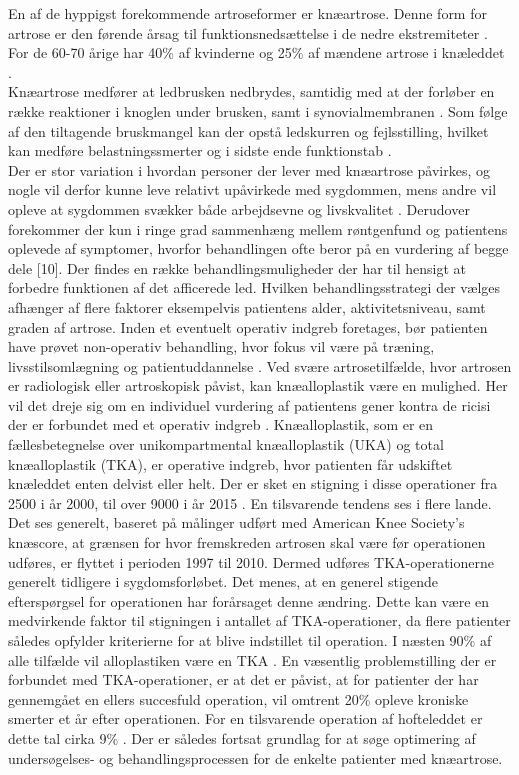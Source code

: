 En af de hyppigst forekommende artroseformer er knæartrose. Denne form for artrose er den førende årsag til funktionsnedsættelse i de nedre ekstremiteter \cite{bezwick2012}. For de 60-70 årige har 40\% af kvinderne og 25\% af mændene artrose i knæleddet \citep{schroder}.\\
Knæartrose medfører at ledbrusken nedbrydes, samtidig med at der forløber en række reaktioner i knoglen under brusken, samt i synovialmembranen \citep{brostrom2012}. Som følge af den tiltagende bruskmangel kan der opstå ledskurren og fejlsstilling, hvilket kan medføre belastningssmerter og i sidste ende funktionstab \citep{ugeskrift2011}. \\
Der er stor variation i hvordan personer der lever med knæartrose påvirkes, og nogle vil derfor kunne leve relativt upåvirkede med sygdommen, mens andre vil opleve at sygdommen svækker både arbejdsevne og livskvalitet \citep{sygdom}. Derudover forekommer der kun i ringe grad sammenhæng mellem røntgenfund og patientens oplevede af symptomer, hvorfor behandlingen ofte beror på en vurdering af begge dele [10]. Der findes en række behandlingsmuligheder der har til hensigt at forbedre funktionen af det afficerede led. Hvilken behandlingsstrategi der vælges afhænger af flere faktorer eksempelvis patientens alder, aktivitetsniveau, samt graden af artrose. Inden et eventuelt operativ indgreb foretages, bør patienten have prøvet non-operativ behandling, hvor fokus vil være på træning, livsstilsomlægning og patientuddannelse \citep{schroder}.
Ved svære artrosetilfælde, hvor artrosen er radiologisk eller artroskopisk påvist, kan knæalloplastik være en mulighed. Her vil det dreje sig om en individuel vurdering af patientens gener kontra de ricisi der er forbundet med et operativ indgreb \citep{schroder}. Knæalloplastik, som er en fællesbetegnelse over unikompartmental knæalloplastik (UKA) og total knæalloplastik (TKA), er operative indgreb, hvor patienten får udskiftet knæleddet enten delvist eller helt. Der er sket en stigning i disse operationer fra 2500 i år 2000, til over 9000 i år 2015 \citep{aarsrapport2016}. En tilsvarende tendens ses i flere lande. Det ses generelt, baseret på målinger udført med American Knee Society's knæscore, at grænsen for hvor fremskreden artrosen skal være før operationen udføres, er flyttet i perioden 1997 til 2010. Dermed udføres TKA-operationerne generelt tidligere i sygdomsforløbet. Det menes, at en generel stigende efterspørgsel for operationen har forårsaget denne ændring. \citep{aarsrapport2011} Dette kan være en medvirkende faktor til stigningen i antallet af TKA-operationer, da flere patienter således opfylder kriterierne for at blive indstillet til operation. I næsten 90\% af alle tilfælde vil alloplastiken være en TKA \citep{aarsrapport2016}. En væsentlig problemstilling der er forbundet med TKA-operationer, er at det er påvist, at for patienter der har gennemgået en ellers succesfuld operation, vil omtrent 20\% opleve kroniske smerter et år efter operationen. For en tilsvarende operation af hofteleddet er dette tal cirka 9\% \citep{bezwick2012}. Der er således fortsat grundlag for at søge optimering af undersøgelses- og behandlingsprocessen for de enkelte patienter med knæartrose.  

